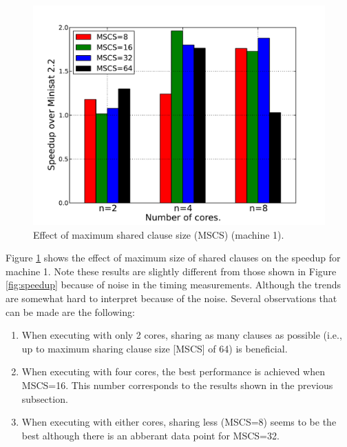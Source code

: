 \documentclass[letterpaper, compsoc, conference]{IEEEtran}
\begin{document}
\begin{figure}[htbp]
    \begin{center}
        \includegraphics[width=\columnwidth]{images/mcs.pdf}
        \caption{Effect of maximum shared clause size (MSCS) (machine 1).}
        \label{fig:mscs}
    \end{center}
\end{figure}

Figure \ref{fig:mscs} shows the effect of maximum size of shared clauses on the
speedup for machine 1. Note these results are slightly different from those
shown in Figure \ref{fig:speedup} because of noise in the timing measurements.
Although the trends are somewhat hard to interpret because of the noise. Several
observations that can be made are the following:

\begin{enumerate}

\item When executing with only 2 cores, sharing as many clauses as possible
(i.e., up to maximum sharing clause size [MSCS] of 64) is beneficial.

\item When executing with four cores, the best performance is achieved when
MSCS=16. This number corresponds to the results shown in the previous
subsection.

\item When executing with either cores, sharing less (MSCS=8) seems to be the
best although there is an abberant data point for MSCS=32.
      
\end{enumerate}
\end{document}
